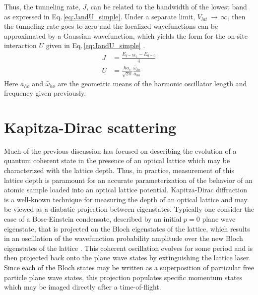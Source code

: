 Thus, the tunneling rate, $J$, can be related to the bandwidth of the lowest band as expressed in Eq.\,\ref{eq:JandU_simple}.
Under a separate limit, $V_{lat}\,\rightarrow\,\infty$, then the tunneling rate goes to zero and the localized wavefunctions can be approximated by a Gaussian wavefunction, which yields the form for the on-site interaction $U$ given in Eq.\,\ref{eq:JandU_simple} \cite{Rey2004}.
	\begin{equation} \label{eq:JandU_simple}
	\begin{aligned}
		 J &= \frac{E_{q=\hbar k_L} - E_{q=0}}{4}\\
		 U &= \frac{\hbar a_s}{\sqrt{2 \pi}}\frac{\bar{\omega}_{ho}}{\bar{a}_{ho}}
	\end{aligned}
	\end{equation}
Here $\bar{a}_{ho}$ and $\bar{\omega}_{ho}$ are the geometric means of the harmonic oscillator length and frequency given previously.

\section{Kapitza-Dirac scattering} \label{sec:latKD}
Much of the previous discussion has focused on describing the evolution of a quantum coherent state in the presence of an optical lattice which may be characterized with the lattice depth.
Thus, in practice, measurement of this lattice depth is paramount for an accurate parameterization of the behavior of an atomic sample loaded into  an optical lattice potential.
Kapitza-Dirac diffraction is a well-known technique for measuring the depth of an optical lattice \cite{Denschlag2002} and may be viewed as a diabatic projection between eigenstates.
Typically one consider the case of a Bose-Einstein condensate, described by an initial $p=0$ plane wave eigenstate, that is projected on the Bloch eigenstates of the lattice, which results in an oscillation of the wavefunction probability amplitude over the new Bloch eigenstates of the lattice \cite{gfo08,Rey2004,MarkusGreiner2003}.
This coherent oscillation evolves for some period and is then projected back onto the plane wave states by extinguishing the lattice laser.
Since each of the Bloch states may be written as a superposition of particular free particle plane wave states, this projection populates specific momentum states which may be imaged directly after a time-of-flight.

